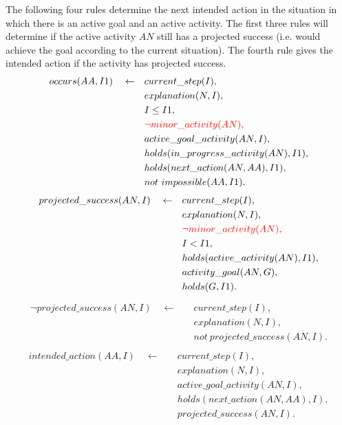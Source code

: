\documentclass[11pt, oneside]{article}
\begin{document}
The following four rules determine the next intended action in the situation in which there is an active goal and an active activity. The first three rules will determine if the active activity $AN$ still has a projected success (i.e. would achieve the goal according to the current situation). The fourth rule gives the intended action if the activity has projected success.  
\begin{align}\begin{split}
occurs(AA,I1)\quad \leftarrow \quad &current\_step(I),\\
&explanation(N,I),\\
&I \leq I1,\\
&\textcolor{red}{\neg minor\_activity(AN),}\\
&active\_goal\_activity(AN,I),\\
&holds(in\_progress\_activity(AN),I1),\\
&holds(next\_action(AN,AA),I1),\\
&not\ impossible(AA,I1).
\end{split}\end{align}
\begin{align}\begin{split}
projected\_success(AN,I) \quad \leftarrow \quad &current\_step(I),\\
&explanation(N,I),\\
&\textcolor{red}{\neg minor\_activity(AN),}\\
&I < I1,\\     
&holds(active\_activity(AN),I1),\\
&activity\_goal(AN,G),\\            
 &holds(G,I1).
\end{split}\end{align}
\begin{align}\begin{split}
\neg projected\_success(AN,I) \quad \leftarrow \quad &current\_step(I),\\
&explanation(N,I),\\
&not\ projected\_success(AN,I).
\end{split}\end{align}
\begin{align}\begin{split}
intended\_action(AA,I)\quad \leftarrow \quad &current\_step(I),\\
&explanation(N,I),\\
&active\_goal\_activity(AN,I),\\
&holds(next\_action(AN,AA),I),\\
&projected\_success(AN,I).
\end{split}\end{align}
\end{document}
